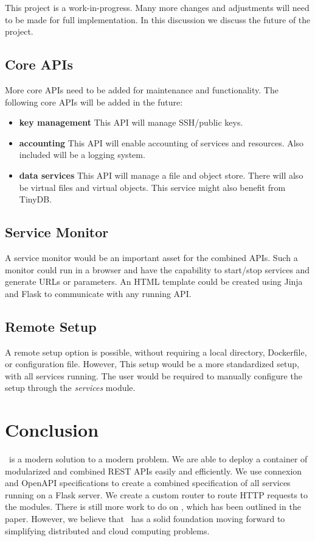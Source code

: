 This project is a work-in-progress. Many more changes and adjustments will
need to be made for full implementation. In this discussion we discuss the
future of the project.

\subsection{Core APIs}

More core APIs need to be added for maintenance and functionality. The
following core APIs will be added in the future:
\begin{itemize}
    \item \textbf{key management} This API will manage SSH/public keys.
    \item \textbf{accounting} This API will enable accounting of services
    and resources. Also included will be a logging system.
    \item \textbf{data services} This API will manage a file and object
    store. There will also be virtual files and virtual objects. This service
    might also benefit from TinyDB.
\end{itemize}

\subsection{Service Monitor}

A service monitor would be an important asset for the combined APIs. Such a
monitor could run in a browser and have the capability to start/stop services
and generate URLs or parameters. An HTML template could be created using
Jinja and Flask to communicate with any running API.

\subsection{Remote Setup}

A remote setup option is possible, without requiring a local directory,
Dockerfile, or configuration file. However, This setup would be a more
standardized setup, with all services running. The user would be required
to manually configure the setup through the \textit{services} module.

\section{Conclusion}

\projectname~is a modern solution to a modern problem. We are able to deploy
a container of modularized and combined REST APIs easily and efficiently. We
use connexion and OpenAPI specifications to create a combined specification of
all services running on a Flask server. We create a custom router to route HTTP
requests to the modules. There is still more work to do on \projectname, which
has been outlined in the paper. However, we believe that \projectname~has
a solid foundation moving forward to simplifying distributed and cloud
computing problems.




